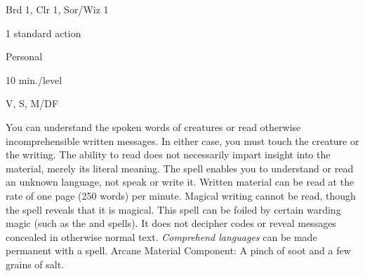 
\begin{description*}
\item[Level:] Brd 1, Clr 1, Sor/Wiz 1
\item[Casting Time:] 1 standard action
\item[Range:] Personal
\item[Duration:] 10 min./level
\item[Components:] V, S, M/DF
\end{description*}

You can understand the spoken words of creatures or read otherwise incomprehensible
written messages. In either case, you must touch the creature or the writing. The
ability to read does not necessarily impart insight into the material, merely its
literal meaning. The spell enables you to understand or read an unknown language,
not speak or write it.
Written material can be read at the rate of one page (250 words) per minute. Magical
writing cannot be read, though the spell reveals that it is magical. This spell
can be foiled by certain warding magic (such as the  and  spells). It does not decipher codes or reveal messages concealed in otherwise
normal text.
\textit{Comprehend languages} can be made permanent with a  spell.
Arcane Material Component: A pinch of soot and a few grains of salt.